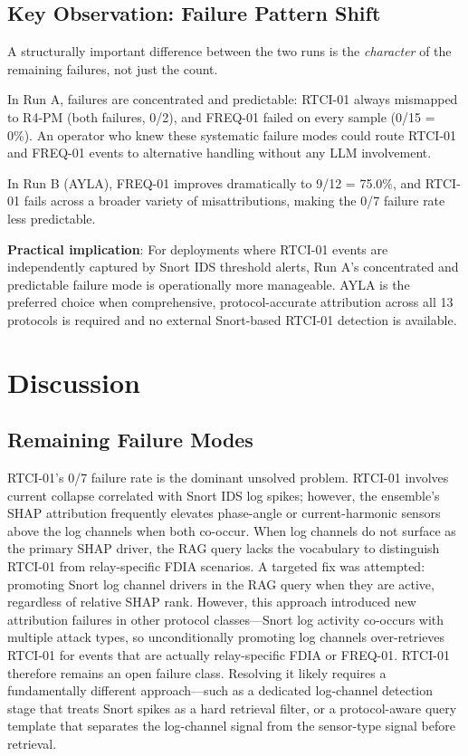 \documentclass[twocolumn, 10pt, letterpaper]{article}
\begin{document}
\subsection*{Key Observation: Failure Pattern Shift}

A structurally important difference between the two runs is the \textit{character}
of the remaining failures, not just the count.

In Run A, failures are concentrated and predictable: RTCI-01 always mismapped
to R4-PM (both failures, 0/2), and FREQ-01 failed on every sample (0/15 = 0\%).
An operator who knew these systematic failure modes could route RTCI-01 and
FREQ-01 events to alternative handling without any LLM involvement.

In Run B (AYLA), FREQ-01 improves dramatically to 9/12 = 75.0\%, and
RTCI-01 fails across a broader variety of misattributions, making the 0/7
failure rate less predictable.

\textbf{Practical implication}: For deployments where RTCI-01 events are
independently captured by Snort IDS threshold alerts, Run A's concentrated and
predictable failure mode is operationally more manageable.
AYLA is the preferred choice when comprehensive, protocol-accurate attribution
across all 13 protocols is required and no external Snort-based RTCI-01
detection is available.

\section{Discussion}
\label{sec:discussion}

\subsection{Remaining Failure Modes}

RTCI-01's 0/7 failure rate is the dominant unsolved problem.
RTCI-01 involves current collapse correlated with Snort IDS log spikes;
however, the ensemble's SHAP attribution frequently elevates phase-angle or
current-harmonic sensors above the log channels when both co-occur.
When log channels do not surface as the primary SHAP driver, the RAG query
lacks the vocabulary to distinguish RTCI-01 from relay-specific FDIA scenarios.
A targeted fix was attempted: promoting Snort log channel drivers in the RAG
query when they are active, regardless of relative SHAP rank.
However, this approach introduced new attribution failures in other protocol
classes---Snort log activity co-occurs with multiple attack types, so
unconditionally promoting log channels over-retrieves RTCI-01 for events that
are actually relay-specific FDIA or FREQ-01.
RTCI-01 therefore remains an open failure class.
Resolving it likely requires a fundamentally different approach---such as a
dedicated log-channel detection stage that treats Snort spikes as a hard
retrieval filter, or a protocol-aware query template that separates the
log-channel signal from the sensor-type signal before retrieval.
\end{document}

